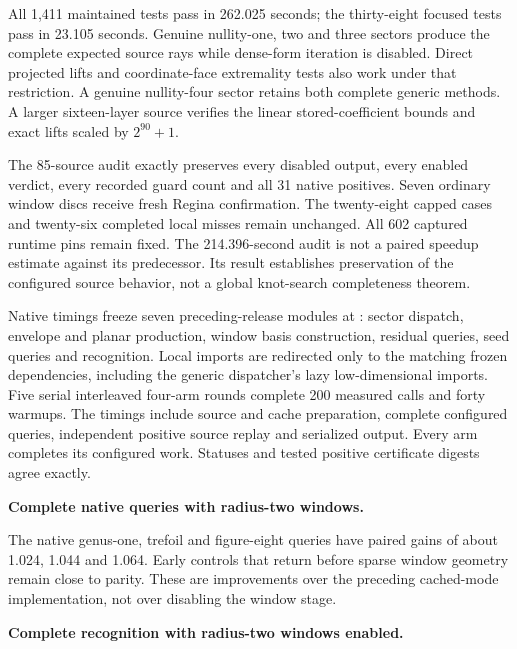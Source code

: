 All 1,411 maintained tests pass in 262.025 seconds; the thirty-eight focused
tests pass in 23.105 seconds. Genuine nullity-one, two and three sectors
produce the complete expected source rays while dense-form iteration is
disabled. Direct projected lifts and coordinate-face extremality tests
also work under that restriction. A genuine nullity-four sector retains
both complete generic methods. A larger sixteen-layer source verifies
the linear stored-coefficient bounds and exact lifts scaled by $2^{90}+1$.

The 85-source audit exactly preserves every disabled output, every enabled
verdict, every recorded guard count and all 31 native positives. Seven
ordinary window discs receive fresh Regina confirmation. The twenty-eight
capped cases and twenty-six completed local misses remain unchanged.
All 602 captured runtime pins remain fixed. The 214.396-second audit is
not a paired speedup estimate against its predecessor. Its result establishes
preservation of the configured source behavior, not a global knot-search
completeness theorem.

Native timings freeze seven preceding-release modules at
: sector dispatch, envelope and planar production, window
basis construction, residual queries, seed queries and recognition.
Local imports are redirected only to the matching frozen dependencies,
including the generic dispatcher's lazy low-dimensional imports. Five
serial interleaved four-arm rounds complete 200 measured calls and forty
warmups. The timings include source and cache preparation, complete
configured queries, independent positive source replay and serialized output.
Every arm completes its configured work. Statuses and tested positive
certificate digests agree exactly.

\begin{samepage}
\noindent\textbf{Complete native queries with radius-two windows.}

\end{samepage}

The native genus-one, trefoil and figure-eight queries have paired gains
of about 1.024, 1.044 and 1.064. Early controls that return before sparse
window geometry remain close to parity. These are improvements over the
preceding cached-mode implementation, not over disabling the window stage.

\begin{samepage}
\noindent\textbf{Complete recognition with radius-two windows enabled.}

\end{samepage}

